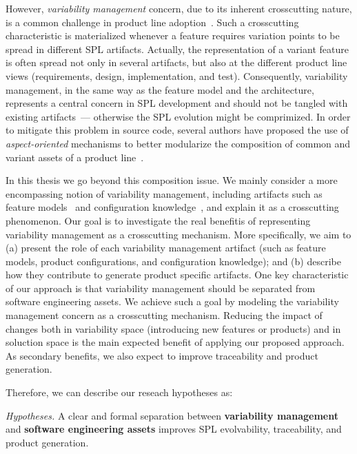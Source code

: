 \documentclass[11pt]{report}
\begin{document}
However, \emph{variability management} concern, due to its inherent crosscutting
nature, is a common challenge in product line
adoption~\cite{northrop-spl-book,phol-spl-book}. Such a crosscutting
characteristic is materialized whenever a feature requires variation points to be
spread in different SPL artifacts. Actually, the representation of a variant
feature is often spread not only in several artifacts, but also at the different
product line views (requirements, design, implementation, and test).
Consequently, variability management, in the same way as the feature model and
the architecture, represents a central concern in SPL development and should not
be tangled with existing artifacts~\cite{phol-spl-book}--- otherwise the
SPL evolution might be comprimized. In order to mitigate this problem in
source code, several authors have proposed the use of \emph{aspect-oriented}
mechanisms to better modularize the composition of common and variant assets 
of a product line~\cite{alves-gpce-06, apel-icse2006}.

In this thesis we go beyond this composition issue. We mainly consider a
more encompassing notion of variability management, including artifacts such as
feature models~\cite{gheyi-alloy-06,czarnecki-book} and configuration
knowledge~\cite{czarnecki-book, phol-spl-book}, and explain it  as a crosscutting
phenomenon. Our goal is to investigate the real benefitis of representing 
variability management as a crosscutting mechanism. More specifically, we
aim to (a) present the role of each variability management artifact (such as
feature models, product configurations, and configuration knowledge); and (b)
describe how they contribute to generate product specific artifacts.
One key characteristic of our approach is that variability management should be
separated from software engineering assets. We achieve such a goal 
by modeling the variability management concern as a crosscutting mechanism.
Reducing the impact of changes both in variability space (introducing new
features or products) and in soluction space is the main expected benefit
of applying our proposed approach. As secondary benefits, we also expect
to improve traceability and product generation. 

Therefore, we can describe our reseach hypotheses as: 

 \hrulefill

{\emph{Hypotheses.} A clear and formal separation between
{\bf variability management} and {\bf software engineering assets} improves SPL evolvability,
traceability, and product generation.}
\end{document}

